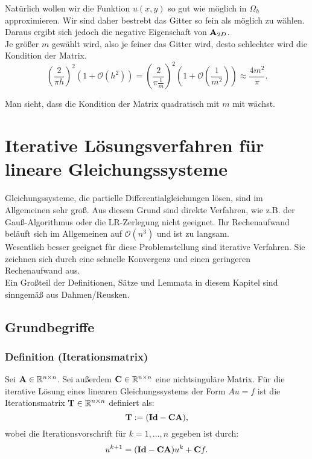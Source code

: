 Natürlich wollen wir die Funktion $u(x,y)$ so gut wie möglich in $\Omega_{h}$ approximieren. Wir sind daher bestrebt das Gitter so fein als möglich zu wählen. Daraus ergibt sich jedoch die negative Eigenschaft von ${\textbf{A}}_{2D}$. \\
Je größer $m$ gewählt wird, also je feiner das Gitter wird, desto schlechter wird die Kondition der Matrix.
\begin{equation}
\left( \frac {2} {\pi h} \right)^{2} (1 + \mathcal{O}(h^{2})) = \left( \frac {2} {\pi \frac {1} {m}} \right)^{2} (1 + \mathcal{O}(\frac {1} {m^{2}})) \approx \frac {4m^{2}} {\pi}.
\end{equation}

Man sieht, dass die Kondition der Matrix quadratisch mit $m$ mit wächst.

\chapter{Iterative Lösungsverfahren für lineare Gleichungssysteme}\label{c.IterativeVerfahren}

Gleichungssysteme, die partielle Differentialgleichungen lösen, sind im Allgemeinen sehr groß. Aus diesem Grund sind direkte Verfahren, wie z.B. der Gauß-Algorithmus oder die LR-Zerlegung nicht geeignet. Ihr Rechenaufwand beläuft sich im Allgemeinen auf $\mathcal{O}(n^{3})$ und ist zu langsam.\\
Wesentlich besser geeignet für diese Problemstellung sind iterative Verfahren. Sie zeichnen sich durch eine schnelle Konvergenz und einen geringeren Rechenaufwand aus.\\
Ein Großteil der Definitionen, Sätze und Lemmata in diesem Kapitel sind sinngemäß aus Dahmen/Reusken.

\section{Grundbegriffe}\label{s.Grundbegriffe}

\subsection{Definition (Iterationsmatrix)}\label{ss.Iterationsmatrix}

Sei ${\textbf{A}} \in \mathbb{R}^{n \times n}$. Sei außerdem ${\textbf{C}} \in \mathbb{R}^{n \times n}$ eine nichtsinguläre Matrix. Für die iterative Lösung eines linearen Gleichungssystems der Form $Au = f$ ist die Iterationsmatrix ${\textbf{T}} \in \mathbb{R}^{n \times n}$ definiert als:
\begin{equation}
{\textbf{T}} := ({\textbf{Id}} - {\textbf{C}} {\textbf{A}}),
\end{equation}
wobei die Iterationsvorschrift für $k=1,...,n$ gegeben ist durch:
\begin{equation}
u^{k+1} = ({\textbf{Id}} - {\textbf{C}} {\textbf{A}})u^{k} + {\textbf{C}} f.\label{eq.Iteratives Verfahren}
\end{equation}

